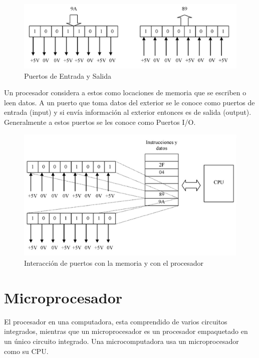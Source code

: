 \documentclass[letterpaper,12pt,oneside]{book}
\begin{document}
				\begin{figure}[!htpb]
					\centering
					\includegraphics[scale = 1.0]{Material de Consulta/PuertosE-S.PNG}
					\caption[Puertos de Entrada y Salida]{Puertos de Entrada y Salida}
					\label{PrtsES}
				\end{figure}

				Un procesador considera a estos como locaciones de memoria que se escriben o leen datos. A un puerto que toma datos del exterior se le conoce como puertos de entrada (input) y si envía información al exterior entonces es de salida (output). Generalmente a estos puertos se les conoce como Puertos I/O.

				\begin{figure}[!htpb]
					\centering
					\includegraphics[scale = 1.0]{Material de Consulta/PrtsIO.PNG}
					\caption[Memoria y Puertos I/O]{Interacción de puertos con la memoria y con el procesador}
					\label{PrtsIO}
				\end{figure}

		\section{Microprocesador}
		El procesador en una computadora, esta comprendido de varios circuitos integrados, mientras que un microprocesador es un procesador empaquetado en un único circuito integrado. Una microcomputadora usa un microprocesador como su CPU\cite{valdes2007microcontroladores}.
\end{document}
